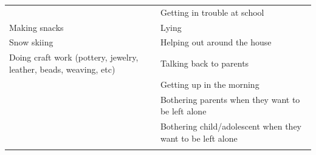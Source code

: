 \documentclass[]{book}
\begin{document}
\begin{longtable}[]{@{}ll@{}}
\begin{minipage}[t]{0.50\columnwidth}
\end{minipage} & \begin{minipage}[t]{0.44\columnwidth}\raggedright
Getting in trouble at school\strut
\end{minipage}\tabularnewline
\begin{minipage}[t]{0.50\columnwidth}\raggedright
Making snacks\strut
\end{minipage} & \begin{minipage}[t]{0.44\columnwidth}\raggedright
Lying\strut
\end{minipage}\tabularnewline
\begin{minipage}[t]{0.50\columnwidth}\raggedright
Snow skiing\strut
\end{minipage} & \begin{minipage}[t]{0.44\columnwidth}\raggedright
Helping out around the house\strut
\end{minipage}\tabularnewline
\begin{minipage}[t]{0.50\columnwidth}\raggedright
Doing craft work (pottery, jewelry, leather, beads, weaving, etc)\strut
\end{minipage} & \begin{minipage}[t]{0.44\columnwidth}\raggedright
Talking back to parents\strut
\end{minipage}\tabularnewline
\begin{minipage}[t]{0.50\columnwidth}\raggedright
\strut
\end{minipage} & \begin{minipage}[t]{0.44\columnwidth}\raggedright
Getting up in the morning\strut
\end{minipage}\tabularnewline
\begin{minipage}[t]{0.50\columnwidth}\raggedright
\strut
\end{minipage} & \begin{minipage}[t]{0.44\columnwidth}\raggedright
Bothering parents when they want to be left alone\strut
\end{minipage}\tabularnewline
\begin{minipage}[t]{0.50\columnwidth}\raggedright
\strut
\end{minipage} & \begin{minipage}[t]{0.44\columnwidth}\raggedright
Bothering child/adolescent when they want to be left alone\strut
\end{minipage}\tabularnewline
\begin{minipage}[t]{0.50\columnwidth}\raggedright
\strut
\end{minipage} & \begin{minipage}[t]{0.44\columnwidth}\raggedright

\end{minipage}
\end{longtable}
\end{document}
